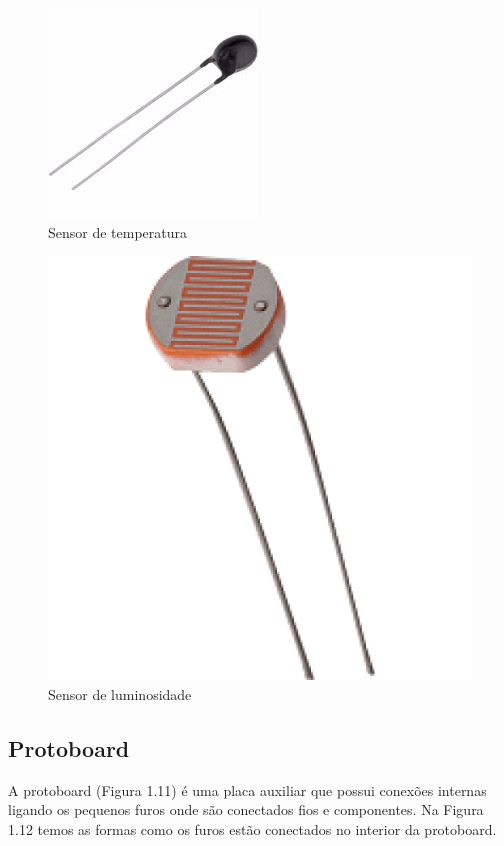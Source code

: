 \begin{figure}[h]
\centering
\includegraphics[scale=0.4]{chapter1/sensortemp.jpg}
\caption{Sensor de temperatura}
\label{fig:9}
\end{figure}
\begin{figure}[h]
\centering
\includegraphics[scale=0.15]{chapter1/sensorlumi.png}
\caption{Sensor de luminosidade}
\label{fig:10}
\end{figure}

\subsection{Protoboard}
\label{subsec:4}
A protoboard (Figura 1.11) é uma placa auxiliar que possui conexões internas ligando os pequenos furos onde são conectados fios e componentes. Na Figura 1.12 temos as formas como os furos estão conectados no interior da protoboard.

